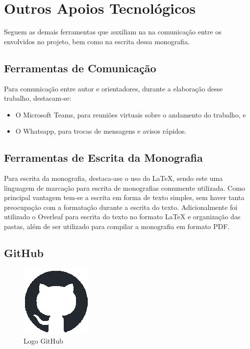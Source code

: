 \section{Outros Apoios Tecnológicos}
\label{sec:demais}

Seguem as demais ferramentas que auxiliam na na comunicação entre os envolvidos no projeto, bem como na escrita dessa monografia.

\subsection{Ferramentas de Comunicação}

Para comunicação entre autor e orientadores, durante a elaboração desse trabalho, destacam-se: 

\begin{itemize}
	\item O Microsoft Teams, para reuniões virtuais sobre o andamento do trabalho, e 
	\item O Whatsapp, para trocas de mensagens e avisos rápidos.
\end{itemize}

\subsection{Ferramentas de Escrita da Monografia}

Para escrita da monografia, destaca-ase o uso do LaTeX, sendo este uma linguagem de marcação para escrita de monografias comumente utilizada. Como principal vantagem tem-se a escrita 
em forma de texto simples, sem haver tanta preocupação com a formatação durante a escrita do texto. Adicionalmente foi utilizado o Overleaf para escrita do texto no formato LaTeX 
e organização das pastas, além de ser utilizado para compilar a monografia em formato PDF.

\subsection{GitHub}

\begin{figure}[ht]
	\centering
	\includegraphics[scale=1]{figuras/referencialTecnologico/github.eps}
	\caption{Logo GitHub}
	\label{fig:github}
\end{figure}

